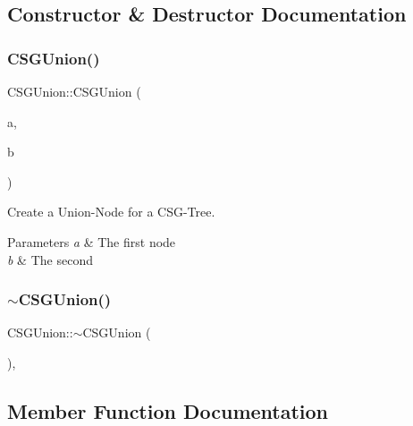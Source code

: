 \subsection{Constructor \& Destructor Documentation}
\mbox{\label{classCSGUnion_a89f33aab1b6e073a2813f97cc3998fc7}} 
\subsubsection{\texorpdfstring{CSGUnion()}{CSGUnion()}}
{\footnotesize\ttfamily C\+S\+G\+Union\+::\+C\+S\+G\+Union (\begin{DoxyParamCaption}\item[{\mbox{\hyperlink{classCSGComponent}{C\+S\+G\+Component}} $\ast$}]{a,  }\item[{\mbox{\hyperlink{classCSGComponent}{C\+S\+G\+Component}} $\ast$}]{b }\end{DoxyParamCaption})\hspace{0.3cm}{\ttfamily [inline]}}



Create a Union-\/\+Node for a C\+S\+G-\/\+Tree. 


\begin{DoxyParams}{Parameters}
{\em a} & The first node \\
\hline
{\em b} & The second \\
\hline
\end{DoxyParams}
\mbox{\label{classCSGUnion_af16ab807f0e1140de88007a5606f2a91}} 
\subsubsection{\texorpdfstring{$\sim$CSGUnion()}{~CSGUnion()}}
{\footnotesize\ttfamily C\+S\+G\+Union\+::$\sim$\+C\+S\+G\+Union (\begin{DoxyParamCaption}{ }\end{DoxyParamCaption})\hspace{0.3cm}{\ttfamily [inline]}, {\ttfamily [override]}}



\subsection{Member Function Documentation}
\mbox{\label{classCSGUnion_a806fa004753847d293e56a93112abe9a}} 
